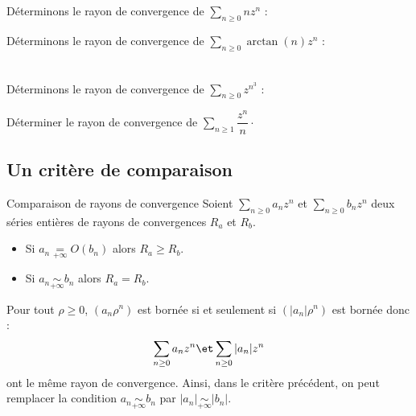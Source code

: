 \documentclass[french,11pt,twoside]{VcCours}
\begin{document}
\begin{Exemple}{} Déterminons le rayon de convergence de $\sum_{n \geq 0} n z^n$ :

\vspace{4cm}
\end{Exemple}

\begin{Exemple}{} Déterminons le rayon de convergence de $\sum_{n \geq 0} \arctan(n) z^n$ :

\vspace{4cm}
\end{Exemple}

\newpage

$\phantom{test}$

\vspace{2cm}

\begin{Exemple}{} Déterminons le rayon de convergence de $\sum_{n \geq 0} z^{n^3}$ :

\vspace{4cm}
\end{Exemple}

\begin{ApplicationDirecte}{} Déterminer le rayon de convergence de $\sum_{n \geq 1} \dfrac{z^n}{n} \cdot$
\end{ApplicationDirecte}
\subsection{Un critère de comparaison}

\begin{Proposition}{Comparaison de rayons de convergence}
Soient $\sum_{n \geq 0} a_n z^n$ et $\sum_{n \geq 0} b_n z^n$ deux séries entières de rayons de convergences $R_a$ et $R_b$. 
\begin{itemize}
\item Si $a_n \underset{+ \infty}{=} O(b_n)$ alors $R_a \geq R_b$.
\item Si $a_n \underset{+ \infty}{\sim} b_n$ alors $R_a = R_b$.
\end{itemize}
\end{Proposition}

\begin{Demonstration}{}
\vspace{5cm}
\end{Demonstration}

\begin{Remarque}{} Pour tout $\rho \geq 0$, $(a_n \rho^n)$ est bornée si et seulement si $(\vert a_n \vert \rho^n)$ est bornée donc :
$$ \sum_{n \geq 0} a_n z^n \et \sum_{n \geq 0} \vert a_n \vert z^n$$
ont le même rayon de convergence. Ainsi, dans le critère précédent, on peut remplacer la condition $a_n \underset{+ \infty}{\sim} b_n$ par $\vert a_n \vert \underset{+ \infty}{\sim} \vert b_n \vert$.
\end{Remarque}
\end{document}
